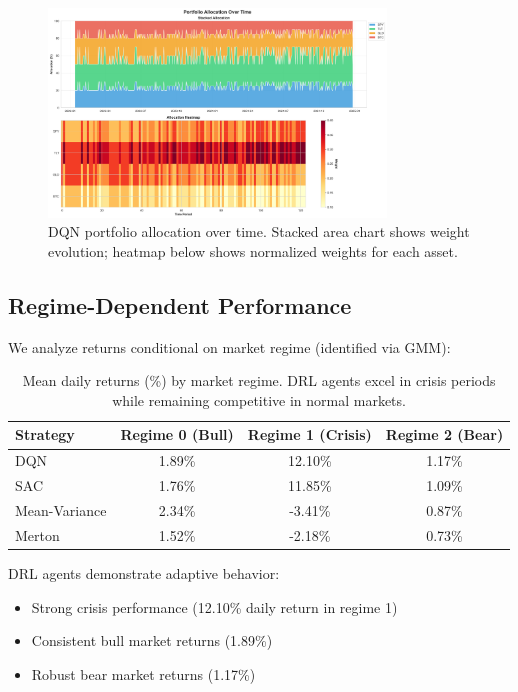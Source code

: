\documentclass[12pt]{article}
\begin{document}
\begin{figure}[h]
    \centering
    \includegraphics[width=0.8\textwidth]{../simulations/enhanced_viz/allocation_heatmap.png}
    \caption{DQN portfolio allocation over time. Stacked area chart shows weight evolution; heatmap below shows normalized weights for each asset.}
    \label{fig:allocation}
\end{figure}

\subsection{Regime-Dependent Performance}

We analyze returns conditional on market regime (identified via GMM):

\begin{table}[h]
\centering
\begin{tabular}{lccc}
\toprule
\textbf{Strategy} & \textbf{Regime 0 (Bull)} & \textbf{Regime 1 (Crisis)} & \textbf{Regime 2 (Bear)} \\
\midrule
DQN & 1.89\% & 12.10\% & 1.17\% \\
SAC & 1.76\% & 11.85\% & 1.09\% \\
Mean-Variance & 2.34\% & -3.41\% & 0.87\% \\
Merton & 1.52\% & -2.18\% & 0.73\% \\
\bottomrule
\end{tabular}
\caption{Mean daily returns (\%) by market regime. DRL agents excel in crisis periods while remaining competitive in normal markets.}
\label{tab:regime}
\end{table}

DRL agents demonstrate adaptive behavior:
\begin{itemize}
    \item Strong crisis performance (12.10\% daily return in regime 1)
    \item Consistent bull market returns (1.89\%)
    \item Robust bear market returns (1.17\%)
\end{itemize}
\end{document}

